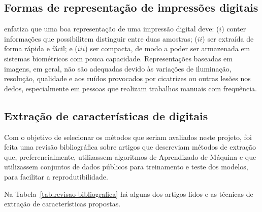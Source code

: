 \subsection{Formas de representação de impressões digitais}\label{subsec:representacao_de_digitais}

 enfatiza que uma boa representação de uma impressão digital deve: ($i$) conter informações que possibilitem distinguir entre duas amostras; ($ii$) ser extraída de forma rápida e fácil; e ($iii$) ser compacta, de modo a poder ser armazenada em sistemas biométricos com pouca capacidade. Representações baseadas em imagens, em geral, não são adequadas devido às variações de iluminação, resolução, qualidade e aos ruídos provocados por cicatrizes ou outras lesões nos dedos, especialmente em pessoas que realizam trabalhos manuais com frequência.


\subsection{Extração de características de digitais}\label{sec:revisao_bibliografica}

Com o objetivo de selecionar os métodos que seriam avaliados neste projeto, foi feita uma revisão bibliográfica sobre artigos que descreviam métodos de extração que, preferencialmente, utilizassem algoritmos de Aprendizado de Máquina e que utilizassem conjuntos de dados públicos para treinamento e teste dos modelos, para facilitar a reprodutibilidade.

Na Tabela~\ref{tab:revisao-bibliografica} há alguns dos artigos lidos e as técnicas de extração de características propostas.

